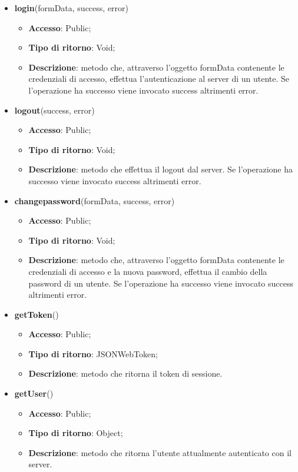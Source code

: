 {\begin{itemize}
\begin{itemize}
			\end{itemize}
			\item \textbf{login}(formData, success, error)
			\begin{itemize}
				\item \textbf{Accesso}: Public;
				\item \textbf{Tipo di ritorno}: Void;
				\item \textbf{Descrizione}: metodo che, attraverso l'oggetto formData contenente le credenziali di accesso, effettua l'autenticazione al server di un utente. Se l'operazione ha successo viene invocato success altrimenti error.
			\end{itemize}
			\item \textbf{logout}(success, error)
			\begin{itemize}
				\item \textbf{Accesso}: Public;
				\item \textbf{Tipo di ritorno}: Void;
				\item \textbf{Descrizione}: metodo che effettua il logout dal server. Se l'operazione ha successo viene invocato success altrimenti error.
			\end{itemize}
			\item \textbf{changepassword}(formData, success, error)
			\begin{itemize}
				\item \textbf{Accesso}: Public;
				\item \textbf{Tipo di ritorno}: Void;
				\item \textbf{Descrizione}: metodo che, attraverso l'oggetto formData contenente le credenziali di accesso e la nuova password, effettua il cambio della password di un utente. Se l'operazione ha successo viene invocato success altrimenti error.
			\end{itemize}
			\item \textbf{getToken}()
			\begin{itemize}
				\item \textbf{Accesso}: Public;
				\item \textbf{Tipo di ritorno}: JSONWebToken;
				\item \textbf{Descrizione}: metodo che ritorna il token di sessione.
			\end{itemize}
			\item \textbf{getUser}()
			\begin{itemize}
				\item \textbf{Accesso}: Public;
				\item \textbf{Tipo di ritorno}: Object;
				\item \textbf{Descrizione}: metodo che ritorna l'utente attualmente autenticato con il server.
			\end{itemize}
		\end{itemize} 
}
